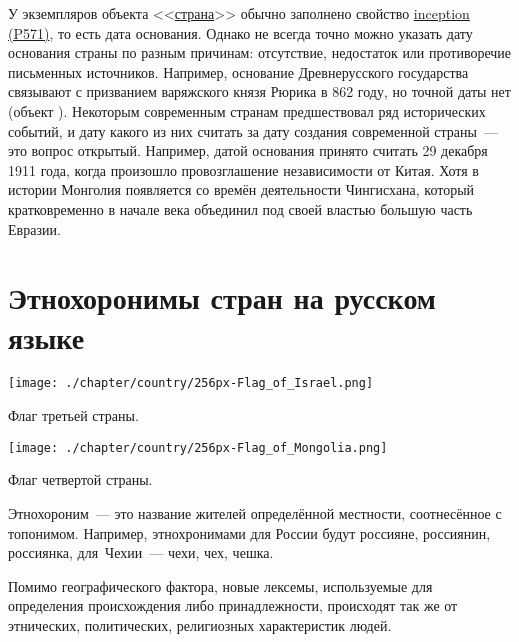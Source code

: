У экземпляров объекта <<\href{https://www.wikidata.org/wiki/Q6256}{страна}>> обычно заполнено свойство \href{https://www.wikidata.org/wiki/Property:P571}{inception (P571)}, то есть дата основания. Однако не всегда точно можно  указать дату основания страны по разным причинам: отсутствие, недостаток или противоречие письменных источников. Например, основание Древнерусского государства связывают с призванием варяжского князя Рюрика в 862 году, но точной даты нет (объект ). 
Некоторым современным странам предшествовал ряд исторических событий, 
и дату какого из них считать за дату создания современной страны~--- это вопрос открытый. 
Например, датой основания  принято считать 29 декабря 1911 года, 
когда произошло провозглашение независимости от Китая. 
Хотя в истории Монголия появляется со времён деятельности Чингисхана, 
который кратковременно в начале \MakeUppercase{} века объединил под своей властью большую часть Евразии.



\section{Этнохоронимы стран на русском языке}

\begin{marginfigure}[0.0cm]
    \centering
    \texttt{[image: ./chapter/country/256px-Flag\_of\_Israel.png]}
	\caption{Флаг третьей страны.}%
	\label{fig:flag_israel}%
\end{marginfigure}
\begin{marginfigure}[0.0cm]
    \centering
		\texttt{[image: ./chapter/country/256px-Flag\_of\_Mongolia.png]}
	\caption{Флаг четвертой страны.}%
	\label{fig:flag_mongolia}%
\end{marginfigure}

Этнохороним~--- это название жителей определённой местности, соотнесённое с топонимом. 
Например, этнохронимами для России будут россияне, россиянин, россиянка, 
для~Чехии~--- чехи, чех, чешка.

Помимо географического фактора, новые лексемы, используемые для определения происхождения либо принадлежности, происходят так же от этнических, политических, религиозных характеристик людей\autocite{Zhuravleva2012}. 

